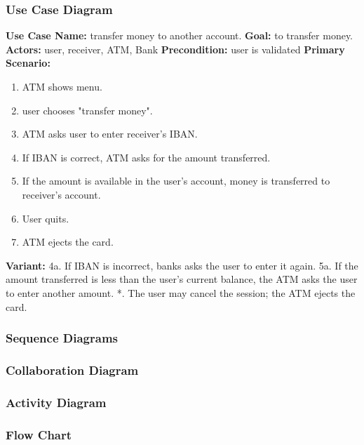 \documentclass{article}
\begin{document}
		\subsubsection{Use Case Diagram}
		\textbf{Use Case Name:}	transfer money to another account.
		\newline\textbf{Goal:} to transfer money.
		\newline\textbf{Actors:} user, receiver, ATM, Bank 	
		\newline\textbf{Precondition:} user is validated 	
		\newline\textbf{Primary Scenario:}	
			\begin{enumerate}[label*=\arabic*.]
				\item ATM shows menu.
				\item user chooses "transfer money".
				\item ATM asks user to enter receiver's IBAN.
				\item If IBAN is correct, ATM asks for the amount transferred.
				\item If the amount is available in the user's account, money is transferred to receiver's account.
				\item User quits.
				\item ATM ejects the card.
			\end{enumerate}
		\textbf{Variant:}\newline	
			\hspace*{5mm}4a. If IBAN is incorrect, banks asks the user to enter it again.\newline
			\hspace*{5mm}5a. If the amount transferred is less than the user's current balance, the ATM asks the user to enter another amount.\newline
			\hspace*{5mm}*. The user may cancel the session; the ATM ejects the card.

		\newpage\subsubsection{Sequence Diagrams}
		\subsubsection{Collaboration Diagram}	
		\subsubsection{Activity Diagram}
		\subsubsection{Flow Chart}
\end{document}
